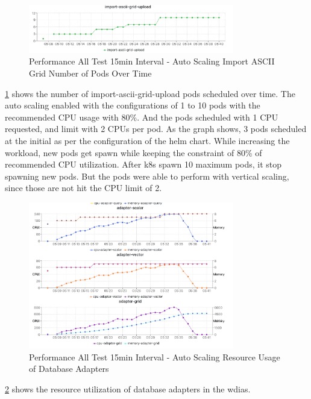 \begin{figure}[htp]
    \centering
    \includegraphics[width=0.8\textwidth]{results/obs/all_auto/obs_all_auto_15m_import_grid_pod.png}
    \caption{Performance All Test 15min Interval - Auto Scaling Import ASCII Grid Number of Pods Over Time }
    \label{fi:obs_all_auto_15m_import_grid_pod}
\end{figure}
\ref{fi:obs_all_auto_15m_import_grid_pod} shows the number of import-ascii-grid-upload pods scheduled over time. The auto scaling enabled with the configurations of 1 to 10 pods with the recommended CPU usage with 80\%. And the pods scheduled with 1 CPU requested, and limit with 2 CPUs per pod.
As the graph shows, 3 pods scheduled at the initial as per the configuration of the helm chart. While increasing the workload, new pods get spawn while keeping the constraint of 80\% of recommended CPU utilization. After \acrshort{k8s} spawn 10 maximum pods, it stop spawning new pods. But the pods were able to perform with vertical scaling, since those are not hit the CPU limit of 2.

\begin{figure}[htp]
    \centering
    \includegraphics[width=0.8\textwidth]{results/obs/all_auto/obs_all_auto_15m_adapter_dbs_res.png}
    \caption{Performance All Test 15min Interval - Auto Scaling Resource Usage of Database Adapters }
    \label{fi:obs_all_auto_15m_adapter_dbs_res}
\end{figure}
\ref{fi:obs_all_auto_15m_adapter_dbs_res} shows the resource utilization of database adapters in the \acrshort{wdias}.


